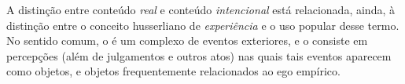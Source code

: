 A distinção entre conteúdo \emph{real} e conteúdo \emph{intencional} está
relacionada, ainda, à distinção entre o conceito husserliano de
\emph{experiência} e o uso popular desse termo. No sentido comum,
o  é um complexo de eventos exteriores,
e o  consiste em percepções (além de julgamentos e outros
atos) nas quais tais eventos aparecem como objetos, e objetos frequentemente
relacionados ao ego empírico. 
